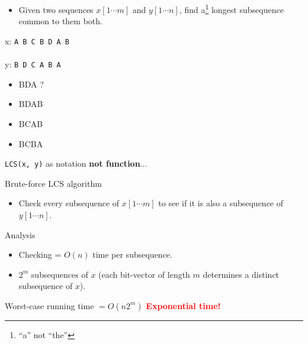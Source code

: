 \documentclass[aspectratio=169]{beamer}
\begin{document}
\begin{frame}{}
    \begin{itemize}
        \item Given two sequences $x[1 \cdots m]$ and $y[1 \cdots n]$, find a\footnote[2]{``a'' not ``the''} longest subsequence common to them both.
    \end{itemize} \pause
    \vspace{10mm}
    {\Huge x: \texttt{A B C B D A B}}\\
    \\
    {\Huge y: \texttt{B D C A B A}} \\
    \begin{itemize} \pause
        \item BDA ? \pause
        \item BDAB \pause
        \item BCAB \pause
        \item BCBA \pause
    \end{itemize}
    \texttt{LCS(x, y)} as notation \textbf{not function}...
\end{frame}

\begin{frame}{Brute-force LCS algorithm}
    \begin{itemize} \pause
        \item Check every subsequence of $x[1 \cdots m]$ to see if it is also a subsequence of $y[1 \cdots n]$.
    \end{itemize} \pause
    \begin{exampleblock}{Analysis}
        \begin{itemize}
            \item Checking = $O(n)$ time per subsequence.
            \item $2^m$ subsequences of $x$ (each bit-vector of length $m$ determines a distinct subsequence of $x$).
        \end{itemize}
        Worst-case running time $= O(n2^m)$ \pause \textcolor{red}{\textbf{Exponential time!}}
    \end{exampleblock}
\end{frame}
\end{document}

